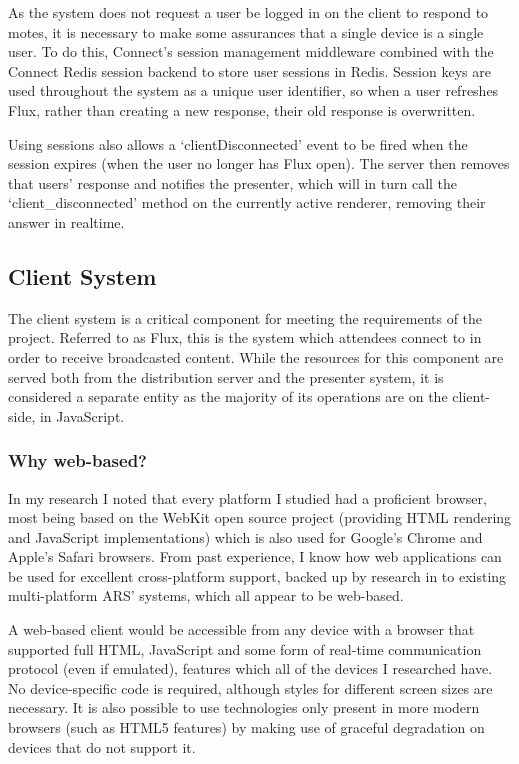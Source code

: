 \documentclass[a4papert,11pt,notitlepage]{ltxdoc}
\begin{document}
As the system does not request a user be logged in on the client to respond to motes, it is necessary to make some assurances that a single device is a single user. To do this, Connect's session management middleware combined with the Connect Redis\cite{connectredis:web} session backend to store user sessions in Redis. Session keys are used throughout the system as a unique user identifier, so when a user refreshes Flux, rather than creating a new response, their old response is overwritten.

Using sessions also allows a `clientDisconnected' event to be fired when the session expires (when the user no longer has Flux open). The server then removes that users' response and notifies the presenter, which will in turn call the `client\_disconnected' method on the currently active renderer, removing their answer in realtime.


\subsection{Client System}
The client system is a critical component for meeting the requirements of the project. Referred to as Flux, this is the system which attendees connect to in order to receive broadcasted content.
While the resources for this component are served both from the distribution server and the presenter system, it is considered a separate entity as the majority of its operations are on the client-side, in JavaScript.

\subsubsection{Why web-based?}
In my research I noted that every platform I studied had a proficient browser, most being based on the WebKit\cite{webkit:web} open source project (providing HTML rendering and JavaScript implementations) which is also used for Google's Chrome and Apple's Safari browsers. From past experience, I know how web applications can be used for excellent cross-platform support, backed up by research in to existing multi-platform ARS' systems, which all appear to be web-based. 

A web-based client would be accessible from any device with a browser that supported full HTML, JavaScript and some form of real-time communication protocol (even if emulated), features which all of the devices I researched have. No device-specific code is required, although styles for different screen sizes are necessary. It is also possible to use technologies only present in more modern browsers (such as HTML5 features) by making use of graceful degradation on devices that do not support it.
\end{document}
